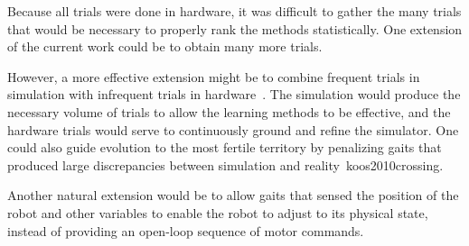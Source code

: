 
Because all trials were done in hardware, it was difficult to gather
the many trials that would be necessary to properly rank the methods statistically.
One extension of the current work could be to obtain many more trials.

However, a more effective extension might be to combine frequent trials in
simulation with infrequent trials in hardware~\cite{bongard}.  The simulation would produce the
necessary volume of trials to allow the learning methods to be
effective, and the hardware trials would serve to continuously ground
and refine the simulator.  One could also guide evolution to the most
fertile territory by penalizing gaits that produced large
discrepancies between simulation and reality~{koos2010crossing}.

Another natural extension would be to allow gaits that sensed the position of the robot and other variables to enable the robot to adjust to its physical state, instead of providing an open-loop sequence of motor commands. 

